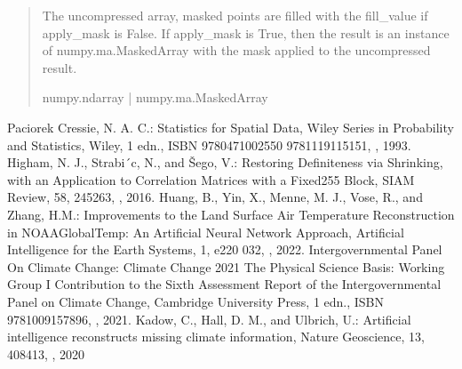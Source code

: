 \documentclass[letterpaper,10pt,english]{sphinxmanual}
\begin{document}
\begin{fulllineitems}
\begin{quote}
\begin{description}
\begin{itemize}
\end{itemize}

\sphinxAtStartPar
{} \textendash{} The uncompressed array, masked points are filled with the fill\_value if
apply\_mask is False. If apply\_mask is True, then the result is an
instance of numpy.ma.MaskedArray with the mask applied to the
uncompressed result.

\sphinxAtStartPar
numpy.ndarray | numpy.ma.MaskedArray

\end{description}\end{quote}

\end{fulllineitems}


\begin{sphinxthebibliography}{Paciorek}
\sphinxAtStartPar
{}
\sphinxAtStartPar
Cressie, N. A. C.: Statistics for Spatial Data, Wiley Series in Probability and Statistics, Wiley, 1 edn., ISBN 978\sphinxhyphen{}0\sphinxhyphen{}471\sphinxhyphen{}00255\sphinxhyphen{}0 978\sphinxhyphen{}1\sphinxhyphen{}119\sphinxhyphen{}11515\sphinxhyphen{}1, , 1993.
\sphinxAtStartPar
Higham, N. J., Strabi´c, N., and Šego, V.: Restoring Definiteness via Shrinking, with an Application to Correlation Matrices with a Fixed255 Block, SIAM Review, 58, 245\textendash{}263, , 2016.
\sphinxAtStartPar
Huang, B., Yin, X., Menne, M. J., Vose, R., and Zhang, H.\sphinxhyphen{}M.: Improvements to the Land Surface Air Temperature Reconstruction in NOAAGlobalTemp: An Artificial Neural Network Approach, Artificial Intelligence for the Earth Systems, 1, e220 032, , 2022.
\sphinxAtStartPar
Intergovernmental Panel On Climate Change: Climate Change 2021 \textendash{} The Physical Science Basis: Working Group I Contribution to the Sixth Assessment Report of the Intergovernmental Panel on Climate Change, Cambridge University Press, 1 edn., ISBN 978\sphinxhyphen{}1\sphinxhyphen{}00\sphinxhyphen{}915789\sphinxhyphen{}6, , 2021.
\sphinxAtStartPar
Kadow, C., Hall, D. M., and Ulbrich, U.: Artificial intelligence reconstructs missing climate information, Nature Geoscience, 13, 408\textendash{}413, , 2020

\end{sphinxthebibliography}
\end{document}
